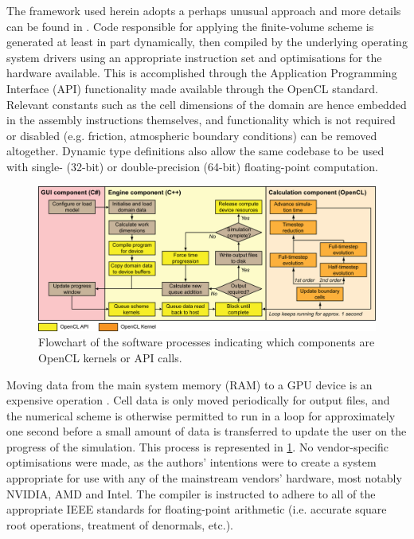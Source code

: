 \documentclass[11pt,english,a4paper]{article}
\begin{document}
The framework used herein adopts a perhaps unusual approach and more details can be found in \citet{Smith2013}. Code responsible for applying the finite-volume scheme is generated at least in part dynamically, then compiled by the underlying operating system drivers using an appropriate instruction set and optimisations for the hardware available. This is accomplished through the Application Programming Interface (API) functionality made available through the OpenCL standard. Relevant constants such as the cell dimensions of the domain are hence embedded in the assembly instructions themselves, and functionality which is not required or disabled (e.g. friction, atmospheric boundary conditions) can be removed altogether. Dynamic type definitions also allow the same codebase to be used with single- (32-bit) or double-precision (64-bit) floating-point computation.

\begin{figure}[tpb]
\centering
\includegraphics[width=1.0\textwidth]{HiPIMS_Structure_NoVis.png}
\caption{Flowchart of the software processes indicating which components are OpenCL kernels or API calls.}
\label{HiPIMS_Structure_NoVis}
\end{figure}

Moving data from the main system memory (RAM) to a GPU device is an expensive operation \citep[see recommendations in][]{AdvancedMicroDevicesInc2011,NVIDIACorporation2009}. Cell data is only moved periodically for output files, and the numerical scheme is otherwise permitted to run in a loop for approximately one second before a small amount of data is transferred to update the user on the progress of the simulation. This process is represented in \ref{HiPIMS_Structure_NoVis}. No vendor-specific optimisations were made, as the authors' intentions were to create a system appropriate for use with any of the mainstream vendors' hardware, most notably NVIDIA, AMD and Intel. The compiler is instructed to adhere to all of the appropriate IEEE standards for floating-point arithmetic (i.e. accurate square root operations, treatment of denormals, etc.).
\end{document}
